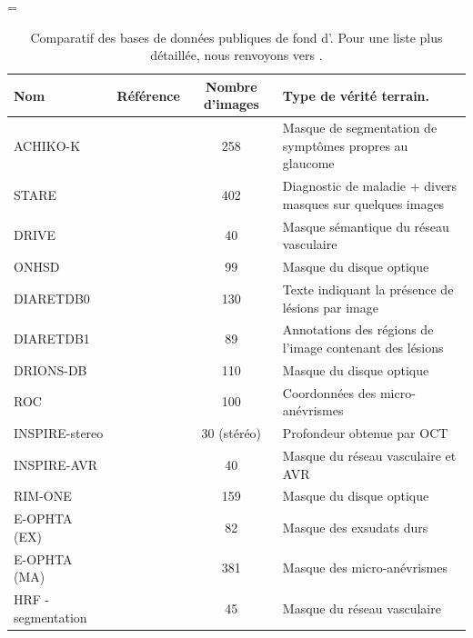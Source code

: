 \begin{center}
	\LTcapwidth=\textwidth
	\begin{longtable}{lccp{5cm}}
		\caption{Comparatif des bases de données publiques de fond d'\oeil{}. Pour une liste plus détaillée, nous renvoyons vers \cite{senguptaOphthalmicDiagnosisUsing2020}. }
		\label{table:database}
		\endfirsthead
		\endhead
		\toprule
		Nom & Référence & Nombre d'images &Type de vérité terrain.
		\\
		\midrule
		ACHIKO-K & \cite{zhangACHIKOKDatabaseFundus2013} & 258 & Masque de segmentation de symptômes propres au glaucome \\
		\midrule
		STARE & \cite{hooverLocatingBloodVessels2000} & 402 & Diagnostic de maladie + divers masques sur quelques images \\
		\midrule
		DRIVE & \cite{staalRidgebasedVesselSegmentation2004}& 40 & Masque sémantique du réseau vasculaire \\
		\midrule
		ONHSD & \cite{lowellOpticNerveHead2004} & 99 &  Masque du disque optique \\
		\midrule
		DIARETDB0 & \multirow{2}{*}{ \cite{zwiggelaarMedicalImageUnderstanding2007}}& 130 & Texte indiquant la présence de lésions par image\\
		DIARETDB1 &\cite{kauppiDIARETDB1DiabeticRetinopathy2007} & 89 & Annotations des régions de l'image contenant des lésions \\
		\midrule
		DRIONS-DB & \cite{carmonaIdentificationOpticNerve2008} & 110 & Masque du disque optique\\
		\midrule
		ROC & \cite{niemeijerRetinopathyOnlineChallenge2010a} & 100 & Coordonnées des micro-anévrismes \\
		\midrule
		INSPIRE-stereo & \cite{tangRobustMultiscaleStereo2011} & 30 (stéréo) & Profondeur obtenue par \ac{OCT}\\
		INSPIRE-AVR & \cite{niemeijerAutomatedMeasurementArteriolartovenular2011}& 40 & Masque du réseau vasculaire et \ac{AVR}\\
		\midrule
		RIM-ONE & \cite{fumeroRIMONEOpenRetinal2011} & 159 & Masque du disque optique \\
		\midrule
		E-OPHTA (EX) & \multirow{2}{*}{ \cite{decenciereTeleOphtaMachineLearning2013}}& 82 & Masque des exsudats durs
		\\
		E-OPHTA (MA) & & 381 & Masque des micro-anévrismes \\
		\midrule
		HRF - segmentation & \multirow{2}{*}{\cite{kohlerAutomaticNoreferenceQuality2013}}& 45 & Masque du réseau vasculaire\\

\end{longtable}
\end{center}
